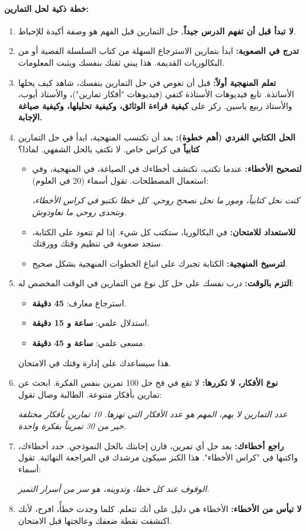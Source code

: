 \documentclass[12pt,a4paper]{book}
\newcommand{\quoteAr}[1]{%
	\begin{myquote}
		\itshape #1
	\end{myquote}
}
\begin{document}
	\paragraph{خطة ذكية لحل التمارين:}
	\begin{enumerate}
		\item \textbf{لا تبدأ قبل أن تفهم الدرس جيداً.} حل التمارين قبل الفهم هو وصفة أكيدة للإحباط.
		\item \textbf{تدرج في الصعوبة:} ابدأ بتمارين الاسترجاع السهلة من كتاب السلسلة الفضية أو من البكالوريات القديمة. هذا يبني ثقتك بنفسك ويثبت المعلومات.
		\item \textbf{تعلم المنهجية أولاً:} قبل أن تغوص في حل التمارين بنفسك، شاهد كيف يحلها الأساتذة. تابع فيديوهات الأستاذة كتفي (فيديوهات "أفكار تمارين")، والأستاذ أيوب، والأستاذ ربيع ياسين. ركز على \textbf{كيفية قراءة الوثائق، وكيفية تحليلها، وكيفية صياغة الإجابة.}
		\item \textbf{الحل الكتابي الفردي (أهم خطوة):} بعد أن تكتسب المنهجية، ابدأ في حل التمارين \textbf{كتابياً} في كراس خاص. لا تكتفِ بالحل الشفهي. لماذا؟
		\begin{itemize}
			\item \textbf{لتصحيح الأخطاء:} عندما تكتب، تكتشف أخطاءك في الصياغة، في المنهجية، وفي استعمال المصطلحات. تقول أسماء (20 في العلوم): \quoteAr{كنت نحل كتابياً، ومور ما نحل نصحح روحي. كل خطا نكتبو في كراس الأخطاء، ونتحدى روحي ما نعاودوش.}
			\item \textbf{للاستعداد للامتحان:} في البكالوريا، ستكتب كل شيء. إذا لم تتعود على الكتابة، ستجد صعوبة في تنظيم وقتك وورقتك.
			\item \textbf{لترسيخ المنهجية:} الكتابة تجبرك على اتباع الخطوات المنهجية بشكل صحيح.
		\end{itemize}
		\item \textbf{التزم بالوقت:} درب نفسك على حل كل نوع من التمارين في الوقت المخصص له:
		\begin{itemize}
			\item استرجاع معارف: \textbf{45 دقيقة}.
			\item استدلال علمي: \textbf{ساعة و 15 دقيقة}.
			\item مسعى علمي: \textbf{ساعة و 45 دقيقة}.
		\end{itemize}
		هذا سيساعدك على إدارة وقتك في الامتحان.
		\item \textbf{نوع الأفكار، لا تكررها:} لا تقع في فخ حل 100 تمرين بنفس الفكرة. ابحث عن تمارين بأفكار متنوعة. الطالبة وصال تقول: \quoteAr{عدد التمارين لا يهم، المهم هو عدد الأفكار التي تهزها. 10 تمارين بأفكار مختلفة خير من 30 تمريناً بفكرة واحدة.}
		\item \textbf{راجع أخطاءك:} بعد حل أي تمرين، قارن إجابتك بالحل النموذجي. حدد أخطاءك، واكتبها في "كراس الأخطاء". هذا الكنز سيكون مرشدك في المراجعة النهائية. تقول أسماء: \quoteAr{الوقوف عند كل خطا، وتدوينه، هو سر من أسرار التميز.}
		\item \textbf{لا تيأس من الأخطاء:} الأخطاء هي دليل على أنك تتعلم. كلما وجدت خطأً، افرح، لأنك اكتشفت نقطة ضعفك وعالجتها قبل الامتحان.
	\end{enumerate}
	
\end{document}
